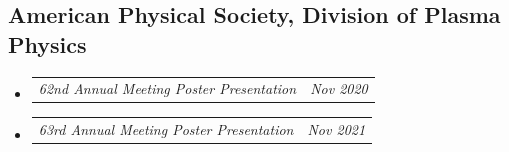 \documentclass[letterpaper,11pt]{article}
\makeatletter
\newcommand{\resumeItem}[1]{
  \item\small{
    {#1 \vspace{-2pt}}
  }
}
\newcommand{\resumeSubSubheading}[2]{
    \vspace{-8pt}\item
    \begin{tabular*}{0.97\textwidth}{l@{\extracolsep{\fill}}r}
      \textit{\small#1} & \textit{\small #2} \\
    \end{tabular*}\vspace{-10pt}
}
\newcommand{\resumeProjectHeading}[2]{
    \vspace{-2pt}\item
    \begin{tabular*}{0.97\textwidth}{l@{\extracolsep{\fill}}r}
      \small#1 & #2 \\
    \end{tabular*}\vspace{-7pt}
}
\newcommand{\resumeSubHeadingListStart}{\begin{itemize}[leftmargin=0.15in, label={}]}
\newcommand{\resumeSubHeadingListEnd}{\end{itemize}}
\newcommand{\resumeItemListStart}{\begin{itemize}}
\newcommand{\resumeItemListEnd}{\end{itemize}\vspace{-5pt}}
\makeatother
\begin{document}
\subsection*{American Physical Society, Division of Plasma Physics}
\resumeSubHeadingListStart
\resumeSubSubheading{62nd Annual Meeting Poster Presentation}{Nov 2020}
\resumeSubSubheading{63rd Annual Meeting Poster Presentation}{Nov 2021}
\resumeSubHeadingListEnd




      
      
      
      
\end{document}
